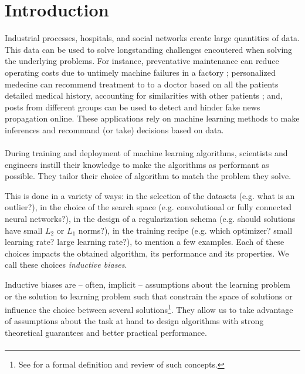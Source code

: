 
\section{Introduction}
Industrial processes, hospitals, and social networks create large quantities of data.
This data can be used to solve longstanding challenges encoutered when solving the underlying problems. For instance, preventative maintenance can reduce operating costs due to untimely machine failures in a factory ; personalized medecine can recommend treatment to to a doctor based on all the patients detailed medical history, accounting for similarities with other patients ; and, posts from different groups can be used to detect and hinder fake news propagation online. These applications rely on machine learning methods to make inferences and recommand (or take) decisions based on data.


\paragraph{}
During training and deployment of machine learning algorithms, scientists and engineers instill their knowledge to make the algorithms as performant as possible. They tailor their choice of algorithm to match the problem they solve.

This is done in a variety of ways: in the selection of the datasets (e.g. what is an outlier?), in the choice of the search space (e.g. convolutional or fully connected neural networks?), in the design of a regularization schema (e.g. should solutions have small $L_2$ or $L_1$ norms?), in the training recipe (e.g. which optimizer? small learning rate? large learning rate?), to mention a few examples. Each of these choices impacts the obtained algorithm, its performance and its properties. We call these choices \emph{inductive biases}.

Inductive biases are -- often, implicit -- assumptions about the learning problem or the solution to learning problem such that constrain the space of solutions or influence the choice between several solutions\footnote{See \cite{mitchell-inductive,1806.01261} for a formal definition and review of such concepts.}. They allow us to take advantage of assumptions about the task at hand to design algorithms with strong theoretical guarantees and better practical performance.

\paragraph{}

